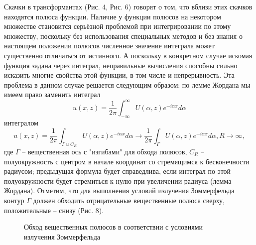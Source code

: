 \documentclass[a4paper, 12pt]{article}
\begin{document}
Скачки в трансформантах (Рис. 4, Рис. 6) говорят о том, что вблизи этих скачков находятся полюса функции. Наличие у функции полюсов на некотором множестве становится серьёзной проблемой при интегрировании по этому множеству, поскольку без использования специальных методов и без знания о настоящем положении полюсов численное значение интеграла может существенно отличаться от истинного. А поскольку в конкретном случае искомая функция задана через интеграл, неправильные вычисления способны сильно исказить многие свойства этой функции, в том числе и непрерывность. Эта проблема в данном случае решается следующим образом: по лемме Жордана мы имеем право заменить интеграл
$$u(x,z) =\frac{1}{2\pi} \int^{\infty}_{-\infty} U(\alpha, z) e^{-i \alpha x} d\alpha$$
интегралом
$$u(x,z) =\frac{1}{2\pi} \int_{\Gamma\cup C_R} U(\alpha, z) e^{-i \alpha x} d\alpha \rightarrow\frac{1}{2\pi} \int_{\Gamma} U(\alpha, z) e^{-i \alpha x} d\alpha, R\rightarrow \infty,$$
где $\Gamma$ -- вещественная ось с "изгибами" для обхода полюсов, $C_R$ -- полуокружность с центром в начале координат со стремящимся к бесконечности радиусом; предыдущая формула будет справедлива, если интеграл по этой полуокружности будет стремиться к нулю при увеличении радиуса (лемма Жордана). Отметим, что для выполнения условий излучения Зоммерфельда контур $\Gamma$ должен обходить отрицательные вещественные полюса сверху, положительные -- снизу (Рис. 8).
\begin{figure}[h!]
\noindent{}
\caption{Обход вещественных полюсов в соответствии с условиями излучения Зоммерфельда}
\label{figCurves}
\end{figure} 
\end{document}
